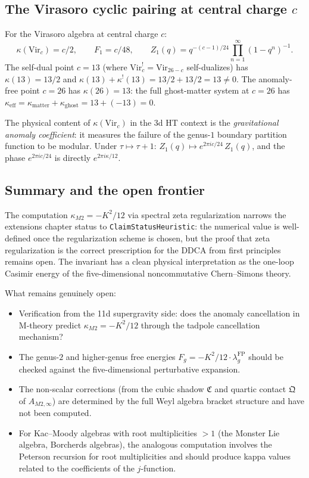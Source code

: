 \documentclass[11pt]{article}
\begin{document}
\subsection{The Virasoro cyclic pairing at central charge $c$}

For the Virasoro algebra at central charge $c$:
\[
\kappa(\mathrm{Vir}_c) = c/2, \qquad
F_1 = c/48, \qquad
Z_1(q) = q^{-(c-1)/24}\prod_{n=1}^\infty (1-q^n)^{-1}.
\]
The self-dual point $c = 13$ (where $\mathrm{Vir}_c^! =
\mathrm{Vir}_{26-c}$ self-dualizes) has
$\kappa(13) = 13/2$ and $\kappa(13) + \kappa^!(13) =
13/2 + 13/2 = 13 \neq 0$.  The anomaly-free point
$c = 26$ has $\kappa(26) = 13$: the full ghost-matter system at
$c = 26$ has $\kappa_{\mathrm{eff}} = \kappa_{\mathrm{matter}} +
\kappa_{\mathrm{ghost}} = 13 + (-13) = 0$.

The physical content of $\kappa(\mathrm{Vir}_c)$ in the 3d HT
context is the \emph{gravitational anomaly coefficient}: it
measures the failure of the genus-$1$ boundary partition function
to be modular.  Under $\tau \mapsto \tau + 1$:
$Z_1(q) \mapsto e^{2\pi i c/24}\, Z_1(q)$, and the phase
$e^{2\pi i c/24}$ is directly $e^{2\pi i \kappa/12}$.

\subsection{Summary and the open frontier}

The computation $\kappa_{M2} = -K^2/12$ via spectral zeta
regularization narrows the extensions chapter status to
\texttt{ClaimStatusHeuristic}: the numerical value is
well-defined once the regularization scheme is chosen,
but the proof that zeta regularization is the correct
prescription for the DDCA from first principles remains open.
The invariant has a clean physical interpretation as the
one-loop Casimir energy of the five-dimensional noncommutative
Chern--Simons theory.

What remains genuinely open:
\begin{itemize}[nosep]
\item Verification from the 11d supergravity side: does the
  anomaly cancellation in M-theory predict $\kappa_{M2} = -K^2/12$
  through the tadpole cancellation mechanism?
\item The genus-$2$ and higher-genus free energies
  $F_g = -K^2/12 \cdot \lambda_g^{\mathrm{FP}}$ should be checked
  against the five-dimensional perturbative expansion.
\item The non-scalar corrections (from the cubic shadow
  $\mathfrak{C}$ and quartic contact $\mathfrak{Q}$ of
  $A_{M2,\infty}$) are determined by the full Weyl algebra
  bracket structure and have not been computed.
\item For Kac--Moody algebras with root multiplicities $> 1$
  (the Monster Lie algebra, Borcherds algebras), the analogous
  computation involves the Peterson recursion for root
  multiplicities and should produce kappa values related to
  the coefficients of the $j$-function.
\end{itemize}
\end{document}
